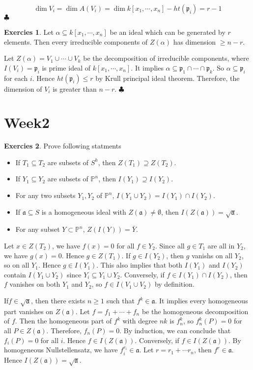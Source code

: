\documentclass[12pt,a4paper]{article}
\theoremstyle{definition}
\newtheorem{exer}{Exercies}[section]
\newcommand*{\qeds}{\hfill\ensuremath{\clubsuit}}
\begin{document}
\[
\dim V_i = \dim A(V_i) = \dim k[x_1, \cdots, x_n] - ht(\mathfrak{p}_i)= r-1
\]
\qeds
\begin{exer}
	Let $\alpha \subseteq k[x_1, \cdots, x_n]$ be an ideal which can be generated by $r$ elements. Then every irreducible components of $Z(\alpha)$ has dimension $\geq n-r$.
\end{exer}
Let $Z(\alpha) = V_1 \cup \cdots \cup V_k$ be the decomposition of irreducible components, where $I(V_i) = \mathfrak{p}_i$ is prime ideal of $k[x_1, \cdots ,x_n]$. It implies $\alpha \subseteq \mathfrak{p}_1 \cap \cdots \cap \mathfrak{p}_k$. So $\alpha \subseteq \mathfrak{p}_i$ for each $i$. Hence $ht(\mathfrak{p}_i) \leq r$ by Krull principal ideal theorem. Therefore, the dimension of $V_i$ is greater than $n-r$.
\qeds
\section{Week2}
\begin{exer}
	Prove following statments
	\begin{itemize}
		\item If $T_1 \subseteq T_2$ are subsets of $S^h$, then $Z(T_1)\supseteq Z(T_2)$.
		\item If $Y_1 \subseteq Y_2$ are subsets of $\mathbb{P}^n$, then $I(Y_1) \supseteq I(Y_2)$.
		\item For any two subsets $Y_1,Y_2$ of $\mathbb{P}^n$, $I(Y_1 \cup Y_2) = I(Y_1) \cap I(Y_2)$.
		\item If $\mathfrak{a} \subseteq S$ is a homogeneous ideal with $Z(\mathfrak{a}) \neq \emptyset$, then $I(Z(\mathfrak{a}))= \sqrt{\mathfrak{a}}$.
		\item For any subset $Y \subset \mathbb{P}^n$, $Z(I(Y)) = \bar{Y}$.
	\end{itemize}

\end{exer}
Let $x \in Z(T_2)$, we have $f(x)=0$ for all $f \in Y_2$. Since all $g \in T_1$ are all in $Y_2$, we have $g(x)=0$. Hence $g \in Z(T_1)$. If $g \in I(Y_2)$, then $g$ vanishs on all $Y_2$, so on all $Y_1$. Hence $g \in I(Y_1)$. This also implies that both $I(Y_1)$ and $I(Y_2)$ contain $I(Y_1 \cup Y_2)$ since $Y_i \subseteq Y_1\cup Y_2$. Conversely, if $f \in I(Y_1) \cap I(Y_2)$, then $f$ vanishes on both $Y_1$ and $Y_2$, so $f \in I(V_1 \cup V_2)$ by definition.

If$f \in \sqrt{\mathfrak{a}}$, then there exists $n \geq 1$ such that $f^k \in \mathfrak{a}$. It implies every homogeneous part vanishes on $Z(\mathfrak{a})$. Let $f= f_1 + \cdots +f_n$ be the homogeneous decomposition of $f$. Then the homogeneous part of $f^k$ with degree $nk$ is $f^k_n$, so $f^k_n(P)=0$ for all $P \in Z(\mathfrak{a})$. Therefore, $f_n(P)=0$. By induction, we can conclude that $f_i(P)=0$ for all $i$. Hence $f \in I(Z(\mathfrak{a}))$. Conversely, if $f \in I(Z(\mathfrak{a}))$. By homogeneous Nullstellensatz, we have $f_i^{r_i} \in \mathfrak{a}$. Let $r= r_1+\cdots r_n$, then $f^r \in \mathfrak{a}$. Hence $I(Z(\mathfrak{a})) = \sqrt{\mathfrak{a}}$. 
\end{document}
